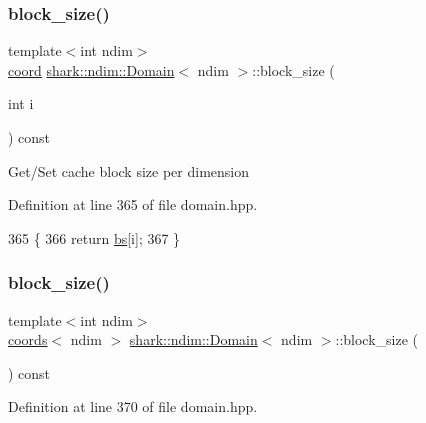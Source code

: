 \subsubsection{\texorpdfstring{block\+\_\+size()}{block\_size()}\hspace{0.1cm}{\footnotesize\ttfamily [1/4]}}
{\footnotesize\ttfamily template$<$int ndim$>$ \\
\hyperlink{namespaceshark_a767a92d5dd82cb82266473bff42fa6d9}{coord} \hyperlink{classshark_1_1ndim_1_1_domain}{shark\+::ndim\+::\+Domain}$<$ ndim $>$\+::block\+\_\+size (\begin{DoxyParamCaption}\item[{int}]{i }\end{DoxyParamCaption}) const\hspace{0.3cm}{\ttfamily [inline]}}

Get/\+Set cache block size per dimension 

Definition at line 365 of file domain.\+hpp.


\begin{DoxyCode}
365                                                                  \{
366                         \textcolor{keywordflow}{return} \hyperlink{classshark_1_1ndim_1_1_domain_a2be17b3d153f7fbbede6eec0afd17ebe}{bs}[i];
367                 \}
\end{DoxyCode}
\hypertarget{classshark_1_1ndim_1_1_domain_a0bdb8748f3d0a8116429939668d5f0d7}{}\label{classshark_1_1ndim_1_1_domain_a0bdb8748f3d0a8116429939668d5f0d7} 
\subsubsection{\texorpdfstring{block\+\_\+size()}{block\_size()}\hspace{0.1cm}{\footnotesize\ttfamily [2/4]}}
{\footnotesize\ttfamily template$<$int ndim$>$ \\
\hyperlink{structshark_1_1ndim_1_1coords}{coords}$<$ ndim $>$ \hyperlink{classshark_1_1ndim_1_1_domain}{shark\+::ndim\+::\+Domain}$<$ ndim $>$\+::block\+\_\+size (\begin{DoxyParamCaption}{ }\end{DoxyParamCaption}) const\hspace{0.3cm}{\ttfamily [inline]}}



Definition at line 370 of file domain.\+hpp.


